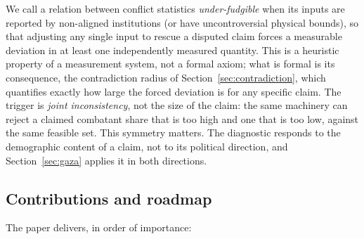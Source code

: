 We call a relation between conflict statistics \emph{under-fudgible} when its inputs are reported by non-aligned institutions (or have uncontroversial physical bounds), so that adjusting any single input to rescue a disputed claim forces a measurable deviation in at least one independently measured quantity. This is a heuristic property of a measurement system, not a formal axiom; what is formal is its consequence, the contradiction radius of Section~\ref{sec:contradiction}, which quantifies exactly how large the forced deviation is for any specific claim. The trigger is \emph{joint inconsistency}, not the size of the claim: the same machinery can reject a claimed combatant share that is too high and one that is too low, against the same feasible set. This symmetry matters. The diagnostic responds to the demographic content of a claim, not to its political direction, and Section~\ref{sec:gaza} applies it in both directions.

\subsection{Contributions and roadmap}

The paper delivers, in order of importance:

